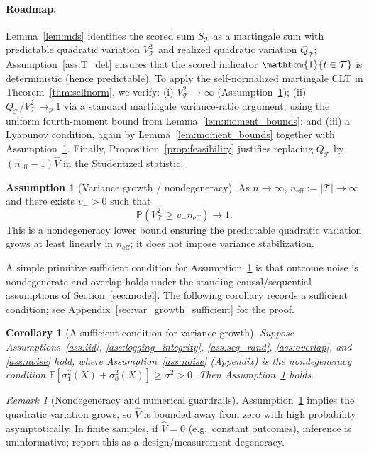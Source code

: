 \documentclass[11pt]{article}
\numberwithin{equation}{section}
\theoremstyle{plain}
\newtheorem{corollary}[theorem]{Corollary}
\theoremstyle{definition}
\newtheorem{assumption}[theorem]{Assumption}
\theoremstyle{remark}
\newtheorem{remark}[theorem]{Remark}
\newcommand{\E}{\mathbb{E}}
\newcommand{\Pp}{\mathbb{P}}
\newcommand{\ind}[1]{\mathbbm{1}\{#1\}}
\begin{document}
\paragraph{Roadmap.}
Lemma~\ref{lem:mds} identifies the scored sum $S_{\mathcal{T}}$ as a martingale sum with predictable quadratic variation $V_{\mathcal{T}}^2$ and realized quadratic variation $Q_{\mathcal{T}}$; Assumption~\ref{ass:T_det} ensures that the scored indicator $\ind{t\in\mathcal{T}}$ is deterministic (hence predictable). To apply the self-normalized martingale CLT in Theorem~\ref{thm:selfnorm}, we verify: (i) $V_{\mathcal{T}}^2\to\infty$ (Assumption~\ref{ass:var_growth}); (ii) $Q_{\mathcal{T}}/V_{\mathcal{T}}^2\to_p 1$ via a standard martingale variance-ratio argument, using the uniform fourth-moment bound from Lemma~\ref{lem:moment_bounds}; and (iii) a Lyapunov condition, again by Lemma~\ref{lem:moment_bounds} together with Assumption~\ref{ass:var_growth}. Finally, Proposition~\ref{prop:feasibility} justifies replacing $Q_{\mathcal{T}}$ by $(n_{\mathrm{eff}}-1)\widehat V$ in the Studentized statistic.

\begin{assumption}[Variance growth / nondegeneracy]\label{ass:var_growth}
As $n\to\infty$, $n_{\mathrm{eff}}:=|\mathcal{T}|\to\infty$ and there exists $v_->0$ such that
\[
\Pp\left(V_{\mathcal{T}}^2 \ge v_- n_{\mathrm{eff}}\right)\to 1.
\]
This is a nondegeneracy lower bound ensuring the predictable quadratic variation grows at least linearly in $n_{\mathrm{eff}}$; it does not impose variance stabilization.
\end{assumption}

A simple primitive sufficient condition for Assumption~\ref{ass:var_growth} is that outcome noise is nondegenerate and overlap holds under the standing causal/sequential assumptions of Section~\ref{sec:model}. The following corollary records a sufficient condition; see Appendix~\ref{sec:var_growth_sufficient} for the proof.

\begin{corollary}[A sufficient condition for variance growth]\label{cor:var_growth_suff}
Suppose Assumptions~\ref{ass:iid}, \ref{ass:logging_integrity}, \ref{ass:seq_rand}, \ref{ass:overlap}, and \ref{ass:noise} hold, where Assumption~\ref{ass:noise} (Appendix) is the nondegeneracy condition $\E[\sigma_1^2(X)+\sigma_0^2(X)]\ge \underline{\sigma}^2>0$. Then Assumption~\ref{ass:var_growth} holds.
\end{corollary}

\begin{remark}[Nondegeneracy and numerical guardrails]\label{rem:Vhat_pos}
Assumption~\ref{ass:var_growth} implies the quadratic variation grows, so
$\widehat V$ is bounded away from zero with high probability asymptotically.
In finite samples, if $\widehat V=0$ (e.g.\ constant outcomes), inference is
uninformative; report this as a design/measurement degeneracy.
\end{remark}
\end{document}

